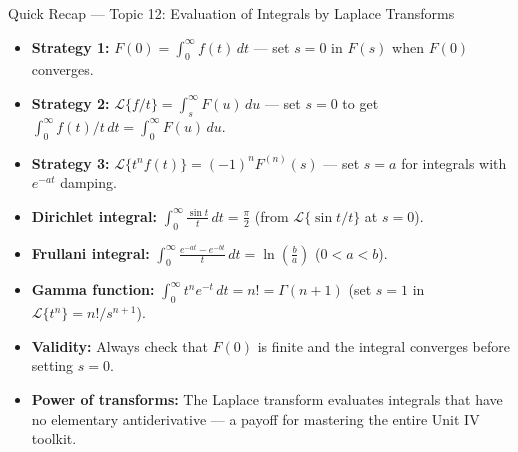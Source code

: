 \documentclass[12pt,a4paper]{article}
\begin{document}
\begin{learnbox}{Quick Recap --- Topic 12: Evaluation of Integrals by Laplace Transforms}
\begin{itemize}[leftmargin=*]
  \item \textbf{Strategy 1:} $F(0) = \int_0^\infty f(t)\,dt$ --- set $s = 0$
        in $F(s)$ when $F(0)$ converges.
  \item \textbf{Strategy 2:} $\mathcal{L}\{f/t\} = \int_s^\infty F(u)\,du$ ---
        set $s = 0$ to get $\int_0^\infty f(t)/t\,dt = \int_0^\infty F(u)\,du$.
  \item \textbf{Strategy 3:} $\mathcal{L}\{t^n f(t)\} = (-1)^n F^{(n)}(s)$ ---
        set $s = a$ for integrals with $e^{-at}$ damping.
  \item \textbf{Dirichlet integral:}
        $\displaystyle\int_0^\infty \frac{\sin t}{t}\,dt = \frac{\pi}{2}$
        (from $\mathcal{L}\{\sin t/t\}$ at $s = 0$).
  \item \textbf{Frullani integral:}
        $\displaystyle\int_0^\infty \frac{e^{-at}-e^{-bt}}{t}\,dt = \ln\!\left(\frac{b}{a}\right)$
        ($0 < a < b$).
  \item \textbf{Gamma function:}
        $\displaystyle\int_0^\infty t^n e^{-t}\,dt = n! = \Gamma(n+1)$
        (set $s = 1$ in $\mathcal{L}\{t^n\} = n!/s^{n+1}$).
  \item \textbf{Validity:} Always check that $F(0)$ is finite and the integral
        converges before setting $s = 0$.
  \item \textbf{Power of transforms:} The Laplace transform evaluates integrals
        that have no elementary antiderivative --- a payoff for mastering the
        entire Unit IV toolkit.
\end{itemize}
\end{learnbox}
\end{document}
